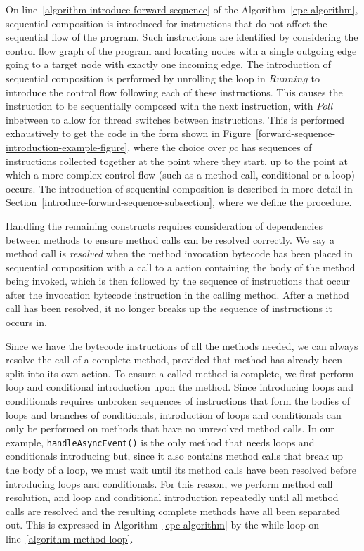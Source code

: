 On line~\ref{algorithm-introduce-forward-sequence} of the
Algorithm~\ref{epc-algorithm}, sequential composition is introduced
for instructions that do not affect the sequential flow of the
program.
Such instructions are identified by considering the control flow graph
of the program and locating nodes with a single outgoing edge going to
a target node with exactly one incoming edge.
The introduction of sequential composition is performed by unrolling
the loop in $Running$ to introduce the control flow following each of
these instructions.
This causes the instruction to be sequentially composed with the next
instruction, with $Poll$ inbetween to allow for thread switches
between instructions.
This is performed exhaustively to get the code in the form shown in
Figure~\ref{forward-sequence-introduction-example-figure}, where the
choice over $pc$ has sequences of instructions collected together at
the point where they start, up to the point at which a more complex
control flow (such as a method call, conditional or a loop) occurs.
The introduction of sequential composition is described in more detail
in Section~\ref{introduce-forward-sequence-subsection}, where we
define the  procedure.

Handling the remaining constructs requires consideration of
dependencies between methods to ensure method calls can be resolved
correctly.
We say a method call is \emph{resolved} when the method invocation
bytecode has been placed in sequential composition with a call to a
\Circus{} action containing the body of the method being invoked,
which is then followed by the sequence of instructions that occur
after the invocation bytecode instruction in the calling method.
After a method call has been resolved, it no longer breaks up the
sequence of instructions it occurs in.

Since we have the bytecode instructions of all the methods needed, we
can always resolve the call of a complete method, provided that method
has already been split into its own \Circus{} action.
To ensure a called method is complete, we first perform loop and
conditional introduction upon the method.
Since introducing loops and conditionals requires unbroken sequences
of instructions that form the bodies of loops and branches of
conditionals, introduction of loops and conditionals can only be
performed on methods that have no unresolved method calls.
In our example, \texttt{handleAsyncEvent()} is the only method that
needs loops and conditionals introducing but, since it also contains
method calls that break up the body of a loop, we must wait until its
method calls have been resolved before introducing loops and
conditionals.
For this reason, we perform method call resolution, and loop and
conditional introduction repeatedly until all method calls are
resolved and the resulting complete methods have all been separated
out.
This is expressed in Algorithm~\ref{epc-algorithm} by the while loop
on line~\ref{algorithm-method-loop}.

